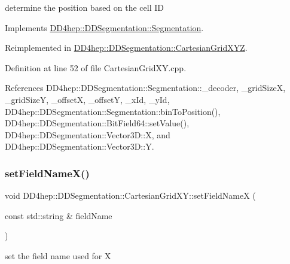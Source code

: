 determine the position based on the cell ID 



Implements \hyperlink{class_d_d4hep_1_1_d_d_segmentation_1_1_segmentation_a594fe6d78667415855858d083b64acad}{D\+D4hep\+::\+D\+D\+Segmentation\+::\+Segmentation}.



Reimplemented in \hyperlink{class_d_d4hep_1_1_d_d_segmentation_1_1_cartesian_grid_x_y_z_ad8d64eb704f1d54553fb9ed24f4bbde4}{D\+D4hep\+::\+D\+D\+Segmentation\+::\+Cartesian\+Grid\+X\+YZ}.



Definition at line 52 of file Cartesian\+Grid\+X\+Y.\+cpp.



References D\+D4hep\+::\+D\+D\+Segmentation\+::\+Segmentation\+::\+\_\+decoder, \+\_\+grid\+SizeX, \+\_\+grid\+SizeY, \+\_\+offsetX, \+\_\+offsetY, \+\_\+x\+Id, \+\_\+y\+Id, D\+D4hep\+::\+D\+D\+Segmentation\+::\+Segmentation\+::bin\+To\+Position(), D\+D4hep\+::\+D\+D\+Segmentation\+::\+Bit\+Field64\+::set\+Value(), D\+D4hep\+::\+D\+D\+Segmentation\+::\+Vector3\+D\+::X, and D\+D4hep\+::\+D\+D\+Segmentation\+::\+Vector3\+D\+::Y.

\hypertarget{class_d_d4hep_1_1_d_d_segmentation_1_1_cartesian_grid_x_y_a2f4cb5d0e804e2489ae2916c9eb3503d}{}\label{class_d_d4hep_1_1_d_d_segmentation_1_1_cartesian_grid_x_y_a2f4cb5d0e804e2489ae2916c9eb3503d} 
\subsubsection{\texorpdfstring{set\+Field\+Name\+X()}{setFieldNameX()}}
{\footnotesize\ttfamily void D\+D4hep\+::\+D\+D\+Segmentation\+::\+Cartesian\+Grid\+X\+Y\+::set\+Field\+NameX (\begin{DoxyParamCaption}\item[{const std\+::string \&}]{field\+Name }\end{DoxyParamCaption})\hspace{0.3cm}{\ttfamily [inline]}}



set the field name used for X 



